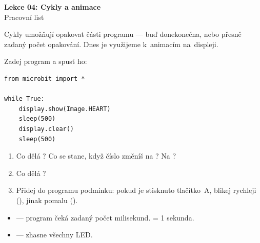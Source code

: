 \newcommand{\lekce}{Lekce 04 -- Pracovní list}




\begin{center}
  {\Large\bfseries\textcolor{microbit-blue}{Lekce 04: Cykly a animace}}\\[4pt]
  {\large Pracovní list}
\end{center}

\medskip\noindent
Cykly umožňují opakovat části programu — buď donekonečna, nebo přesně
zadaný počet opakování. Dnes je využijeme k~animacím na~displeji.

\begin{ukol}

Zadej program a spusť ho:

\begin{lstlisting}
from microbit import *

while True:
    display.show(Image.HEART)
    sleep(500)
    display.clear()
    sleep(500)
\end{lstlisting}

\begin{enumerate}
  \item Co dělá ? Co se stane, když číslo změníš na ?
        Na ?
  \item Co dělá ?
  \item Přidej do programu podmínku: pokud je stisknuto tlačítko~A,
        blikej rychleji (), jinak pomalu ().
\end{enumerate}

\odpoved[2cm]

\begin{tcolorbox}[colback=code-bg, colframe=gray!40,
                  fonttitle=\small\bfseries, title=sleep() a display.clear()]
  \small
  \begin{itemize}[leftmargin=*]
    \item {} — program čeká zadaný počet milisekund.
           = 1 sekunda.
    \item {} — zhasne všechny LED.
  \end{itemize}
\end{tcolorbox}

\end{ukol}

